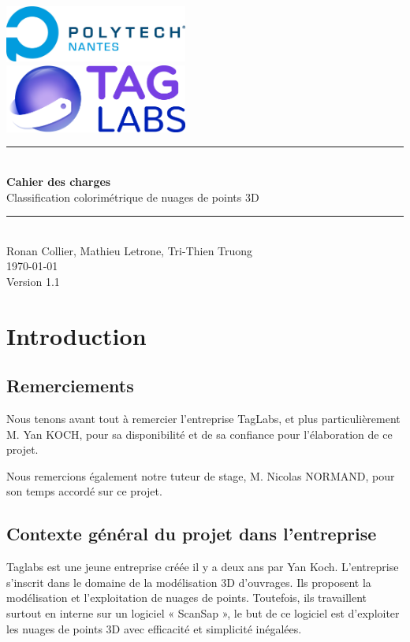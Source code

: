 \documentclass[12pt,titlepage,french]{article}
\begin{document}
\begin{titlepage}
\newcommand{\HRule}{\rule{\linewidth}{0.5mm}}
\center

  \includegraphics[width=0.45\textwidth]{./image2.png}\\[1cm]
   
  \includegraphics[width=0.45\textwidth]{./image1.png}


\HRule \\[0.4cm]
{ \huge \bfseries Cahier des charges \\[0.15cm] }
Classification colorimétrique de nuages de points 3D
\HRule \\[1.5cm]
Ronan Collier,
Mathieu Letrone,
Tri-Thien Truong
\\[1cm]
\today \\ [1cm]
Version 1.1
\end{titlepage}

\tableofcontents
\newpage

\section{Introduction}

\subsection*{Remerciements}

Nous tenons avant tout à remercier l'entreprise TagLabs, et plus particulièrement M. Yan KOCH, pour sa disponibilité et de sa confiance pour l'élaboration de ce projet.

Nous remercions également notre tuteur de stage, M. Nicolas NORMAND, pour son temps accordé sur ce projet.

\subsection*{Contexte général du projet dans l'entreprise}

Taglabs est une jeune entreprise créée il y a deux ans par Yan Koch. L’entreprise s’inscrit dans le domaine de la modélisation 3D d’ouvrages. Ils proposent la modélisation et l’exploitation de nuages de points. Toutefois, ils travaillent surtout en interne sur un logiciel « ScanSap », le but de ce logiciel est d’exploiter les nuages de points 3D avec efficacité et simplicité inégalées.
\end{document}
